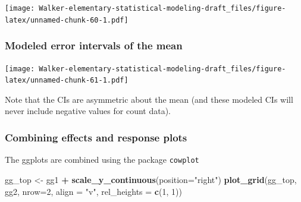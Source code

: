 \documentclass[]{book}
\newenvironment{Shaded}{\begin{snugshade}}{\end{snugshade}}
\newcommand{\KeywordTok}[1]{\textcolor[rgb]{0.13,0.29,0.53}{\textbf{#1}}}
\newcommand{\DataTypeTok}[1]{\textcolor[rgb]{0.13,0.29,0.53}{#1}}
\newcommand{\DecValTok}[1]{\textcolor[rgb]{0.00,0.00,0.81}{#1}}
\newcommand{\FloatTok}[1]{\textcolor[rgb]{0.00,0.00,0.81}{#1}}
\newcommand{\StringTok}[1]{\textcolor[rgb]{0.31,0.60,0.02}{#1}}
\newcommand{\CommentTok}[1]{\textcolor[rgb]{0.56,0.35,0.01}{\textit{#1}}}
\newcommand{\OtherTok}[1]{\textcolor[rgb]{0.56,0.35,0.01}{#1}}
\newcommand{\OperatorTok}[1]{\textcolor[rgb]{0.81,0.36,0.00}{\textbf{#1}}}
\newcommand{\NormalTok}[1]{#1}
\begin{document}
\texttt{[image: Walker-elementary-statistical-modeling-draft\_files/figure-latex/unnamed-chunk-60-1.pdf]}

\subsubsection{Modeled error intervals of the
mean}\label{modeled-error-intervals-of-the-mean}

\begin{Shaded}
\end{Shaded}

\texttt{[image: Walker-elementary-statistical-modeling-draft\_files/figure-latex/unnamed-chunk-61-1.pdf]}

Note that the CIs are asymmetric about the mean (and these modeled CIs
will never include negative values for count data).

\subsubsection{Combining effects and response
plots}\label{combining-effects-and-response-plots}

The ggplots are combined using the package \texttt{cowplot}

\begin{Shaded}
\begin{Highlighting}[]
\NormalTok{gg_top <-}\StringTok{ }\NormalTok{gg1 }\OperatorTok{+}\StringTok{ }\KeywordTok{scale_y_continuous}\NormalTok{(}\DataTypeTok{position=}\StringTok{"right"}\NormalTok{)}
\KeywordTok{plot_grid}\NormalTok{(gg_top, gg2, }\DataTypeTok{nrow=}\DecValTok{2}\NormalTok{, }\DataTypeTok{align =} \StringTok{"v"}\NormalTok{, }\DataTypeTok{rel_heights =} \KeywordTok{c}\NormalTok{(}\DecValTok{1}\NormalTok{, }\DecValTok{1}\NormalTok{))}
\end{Highlighting}
\end{Shaded}
\end{document}
